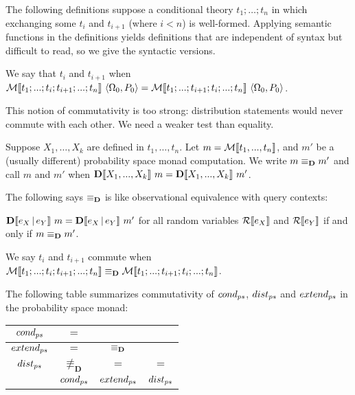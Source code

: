 The following definitions suppose a conditional theory $t_1;\dots;t_n$ in which exchanging some $t_i$ and $t_{i+1}$ (where $i < n$) is well-formed. Applying semantic functions in the definitions yields definitions that are independent of syntax but difficult to read, so we give the syntactic versions.

\begin{definition}[commutativity]
We say that $t_i$ and $t_{i+1}$  when \\ ${\mathcal{M}\!\left\llbracket{t_1;...;t_i;t_{i+1};...;t_n}\right\rrbracket}\ {\langle{\Omega_0,P_0}\rangle} = {\mathcal{M}\!\left\llbracket{t_1;...;t_{i+1};t_i;...;t_n}\right\rrbracket}\ {\langle{\Omega_0,P_0}\rangle}$.
\end{definition}

This notion of commutativity is too strong: distribution statements would never commute with each other. We need a weaker test than equality.

\begin{definition}
Suppose $X_1,\dots,X_k$ are defined in $t_1,\dots,t_n$. Let $m = \mathcal{M}\!\left\llbracket{t_1,...,t_n}\right\rrbracket$, and $m'$ be a (usually different) probability space monad computation. We write $m \equiv_\mathbf{D} m'$ and call $m$ and $m'$  when ${\mathbf{D}\!\left\llbracket{X_1,...,X_k}\right\rrbracket}\ {m} = {\mathbf{D}\!\left\llbracket{X_1,...,X_k}\right\rrbracket}\ {m'}$.
\end{definition}

The following says $\equiv_\mathbf{D}$ is like observational equivalence with query contexts:

\begin{theorem}[context]
\label{thm:context}
${\mathbf{D}\!\left\llbracket{e_X \,|\,e_Y}\right\rrbracket}\ {m} = {\mathbf{D}\!\left\llbracket{e_X \,|\,e_Y}\right\rrbracket}\ {m'}$ for all random variables $\mathcal{R}\!\left\llbracket{e_X}\right\rrbracket$ and $\mathcal{R}\!\left\llbracket{e_Y}\right\rrbracket$ if and only if $m \equiv_\mathbf{D} m'$.
\end{theorem}

\begin{definition}
\label{def:commutativity-in-distribution}
We say $t_i$ and $t_{i+1}$ commute  when $\mathcal{M}\!\left\llbracket{t_1;...;t_i;t_{i+1};...;t_n}\right\rrbracket \equiv_\mathbf{D} \mathcal{M}\!\left\llbracket{t_1;...;t_{i+1};t_i;...;t_n}\right\rrbracket$.
\end{definition}

\begin{theorem}
\label{thm:commutativity}
The following table summarizes commutativity of $cond_{ps}$, $dist_{ps}$ and $extend_{ps}$ in the probability space monad:
\begin{center}
\begin{tabular}{c|c|c|c}
	$cond_{ps}$ & $=$ & & \\
	\hline
	$extend_{ps}$ & $=$ & $\equiv_\mathbf{D}$ & \\
	\hline
	$dist_{ps}$ & $\not\equiv_{\mathbf{D}}$ & $=$ & $=$\\
	\hline
	 & $cond_{ps}$ & $extend_{ps}$ & $dist_{ps}$
\end{tabular}
\end{center}
\end{theorem}

